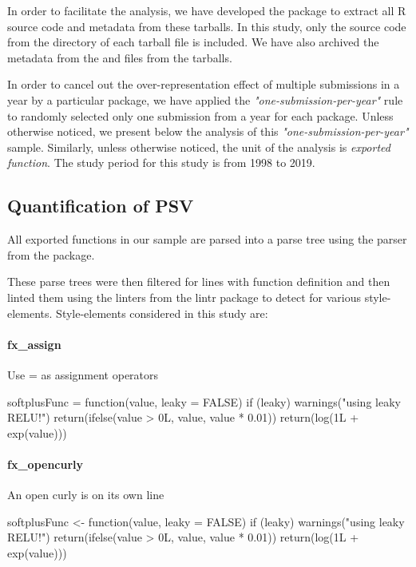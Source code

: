 In order to facilitate the analysis, we have developed the package  \citep{chan2} to extract all R source code and metadata from these tarballs. In this study, only the source code from the  directory of each tarball file is included. We have also archived the metadata from the  and  files from the tarballs.

In order to cancel out the over-representation effect of multiple submissions in a year by a particular package, we have applied the \emph{"one-submission-per-year"} rule to randomly selected only one submission from a year for each package. Unless otherwise noticed, we present below the analysis of this \emph{"one-submission-per-year"} sample. Similarly, unless otherwise noticed, the unit of the analysis is \emph{exported function}. The study period for this study is from 1998 to 2019.

\subsection{Quantification of PSV}

All exported functions in our sample are parsed into a parse tree using the parser from the  \citep{lintr} package.

These parse trees were then filtered for lines with function definition and then linted them using the linters from the lintr package to detect for various style-elements. Style-elements considered in this study are:

\paragraph{fx\_assign}

Use = as assignment operators

\begin{example}
softplusFunc = function(value, leaky = FALSE) {
    if (leaky) {
        warnings("using leaky RELU!")
        return(ifelse(value > 0L, value, value * 0.01))
    }
    return(log(1L + exp(value)))
}
\end{example}

\paragraph{fx\_opencurly}

An open curly is on its own line

\begin{example}
softplusFunc <- function(value, leaky = FALSE) 
{
    if (leaky) 
    {
        warnings("using leaky RELU!")
        return(ifelse(value > 0L, value, value * 0.01))
    }
    return(log(1L + exp(value)))
}
\end{example}


